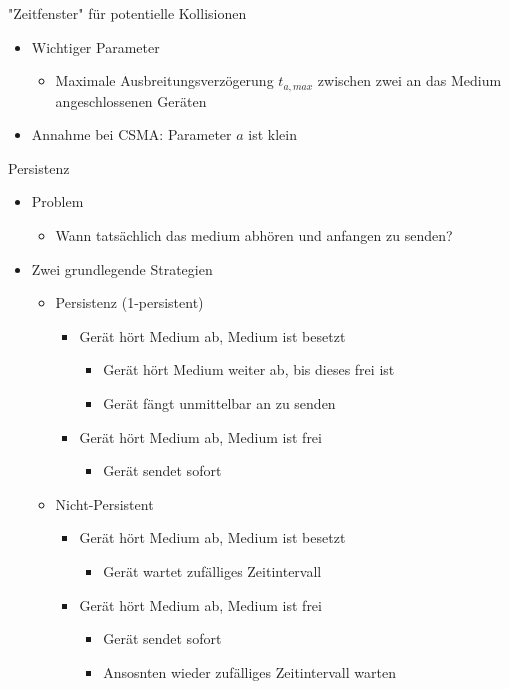      "Zeitfenster" für potentielle Kollisionen
      \begin{itemize}
        \item Wichtiger Parameter
          \begin{itemize}
            \item Maximale Ausbreitungsverzögerung $t_{a,max}$ zwischen zwei an das Medium
              angeschlossenen Geräten
          \end{itemize}
        \item Annahme bei CSMA: Parameter $a$ ist klein
      \end{itemize}
      Persistenz
      \begin{itemize}
        \item Problem
          \begin{itemize}
            \item Wann tatsächlich das medium abhören und anfangen zu senden?
          \end{itemize}
        \item Zwei grundlegende Strategien
          \begin{itemize}
            \item Persistenz (1-persistent)
              \begin{itemize}
                \item Gerät hört Medium ab, Medium ist besetzt
                  \begin{itemize}
                    \item Gerät hört Medium weiter ab, bis dieses frei ist
                    \item Gerät fängt unmittelbar an zu senden
                  \end{itemize}
                \item Gerät hört Medium ab, Medium ist frei
                  \begin{itemize}
                    \item Gerät sendet sofort
                  \end{itemize}
              \end{itemize}
            \item Nicht-Persistent
              \begin{itemize}
                \item Gerät hört Medium ab, Medium ist besetzt
                  \begin{itemize}
                    \item Gerät wartet zufälliges Zeitintervall
                  \end{itemize}
                \item Gerät hört Medium ab, Medium ist frei
                  \begin{itemize}
                    \item Gerät sendet sofort
                    \item Ansosnten wieder zufälliges Zeitintervall warten
                  \end{itemize}
              \end{itemize}
          \end{itemize}
      \end{itemize}
